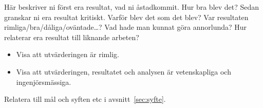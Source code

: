 Här beskriver ni först era resultat, vad ni åstadkommit.  Hur bra blev det?
Sedan granskar ni era resultat kritiskt.  Varför blev det som det blev?  Var resultaten rimliga/bra/dåliga/o\-vän\-ta\-de\ldots?  
Vad hade man kunnat göra annorlunda?  Hur relaterar era resultat till liknande arbeten?  

\begin{itemize}
\item Visa att utvärderingen är rimlig.
\item Visa att utvärderingen, resultatet och analysen är vetenskapliga och in\-gen\-jörs\-mässiga.
\end{itemize}

Relatera till mål och syften etc i avsnitt~\ref{sec:syfte}.

